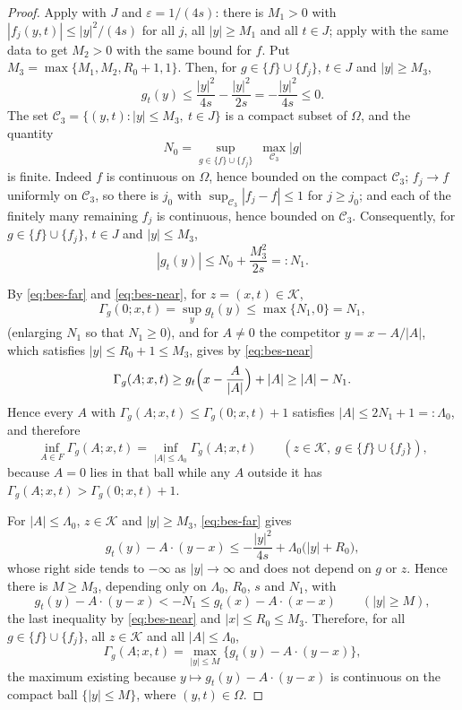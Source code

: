 \begin{proof}
Apply  with $J$ and $\varepsilon=1/(4s)$:
there is $M_1>0$ with $|f_j(y,t)|\le|y|^2/(4s)$ for all $j$, all $|y|\ge M_1$
and all $t\in J$; apply  with the same data to get
$M_2>0$ with the same bound for $f$. Put $M_3=\max\{M_1,M_2,R_0+1,1\}$. Then,
for $g\in\{f\}\cup\{f_j\}$, $t\in J$ and $|y|\ge M_3$,
\begin{equation}\label{eq:bes-far}
  g_t(y)\le\frac{|y|^2}{4s}-\frac{|y|^2}{2s}=-\frac{|y|^2}{4s}\le0 .
\end{equation}
The set $\mathcal C_3=\{(y,t):|y|\le M_3,\ t\in J\}$ is a compact subset of
$\Omega$, and the quantity
\[
  N_0=\sup_{g\in\{f\}\cup\{f_j\}}\ \max_{\mathcal C_3}|g|
\]
is finite. Indeed $f$ is continuous on $\Omega$, hence bounded on the compact
$\mathcal C_3$; $f_j\to f$ uniformly on $\mathcal C_3$, so there is $j_0$ with
$\sup_{\mathcal C_3}|f_j-f|\le1$ for $j\ge j_0$; and each of the finitely many
remaining $f_j$ is continuous, hence bounded on $\mathcal C_3$. Consequently,
for $g\in\{f\}\cup\{f_j\}$, $t\in J$ and $|y|\le M_3$,
\begin{equation}\label{eq:bes-near}
  |g_t(y)|\le N_0+\frac{M_3^2}{2s}=:N_1 .
\end{equation}

By \eqref{eq:bes-far} and \eqref{eq:bes-near}, for $z=(x,t)\in\mathcal K$,
\[
  \Gamma_g(0;x,t)=\sup_yg_t(y)\le\max\{N_1,0\}=N_1 ,
\]
(enlarging $N_1$ so that $N_1\ge0$), and for $A\ne0$ the competitor
$y=x-A/|A|$, which satisfies $|y|\le R_0+1\le M_3$, gives by
\eqref{eq:bes-near}
\[
  \Gamma_g(A;x,t)\ge g_t\Bigl(x-\frac A{|A|}\Bigr)+|A|\ge|A|-N_1 .
\]
Hence every $A$ with $\Gamma_g(A;x,t)\le\Gamma_g(0;x,t)+1$ satisfies
$|A|\le2N_1+1=:\Lambda_0$, and therefore
\begin{equation}\label{eq:bes-infball}
  \inf_{A\in F}\Gamma_g(A;x,t)=\inf_{|A|\le\Lambda_0}\Gamma_g(A;x,t)
  \qquad(z\in\mathcal K,\ g\in\{f\}\cup\{f_j\}),
\end{equation}
because $A=0$ lies in that ball while any $A$ outside it has
$\Gamma_g(A;x,t)>\Gamma_g(0;x,t)+1$.

For $|A|\le\Lambda_0$, $z\in\mathcal K$ and $|y|\ge M_3$, \eqref{eq:bes-far}
gives
\[
  g_t(y)-A\cdot(y-x)\le-\frac{|y|^2}{4s}+\Lambda_0\bigl(|y|+R_0\bigr),
\]
whose right side tends to $-\infty$ as $|y|\to\infty$ and does not depend on $g$
or $z$. Hence there is $M\ge M_3$, depending only on $\Lambda_0$, $R_0$, $s$ and
$N_1$, with
\[
  g_t(y)-A\cdot(y-x)<-N_1\le g_t(x)-A\cdot(x-x)
  \qquad(|y|\ge M),
\]
the last inequality by \eqref{eq:bes-near} and $|x|\le R_0\le M_3$. Therefore,
for all $g\in\{f\}\cup\{f_j\}$, all $z\in\mathcal K$ and all $|A|\le\Lambda_0$,
\begin{equation}\label{eq:bes-max}
  \Gamma_g(A;x,t)=\max_{|y|\le M}\bigl\{g_t(y)-A\cdot(y-x)\bigr\},
\end{equation}
the maximum existing because $y\mapsto g_t(y)-A\cdot(y-x)$ is continuous on the
compact ball $\{|y|\le M\}$, where $(y,t)\in\Omega$.


\end{proof}
